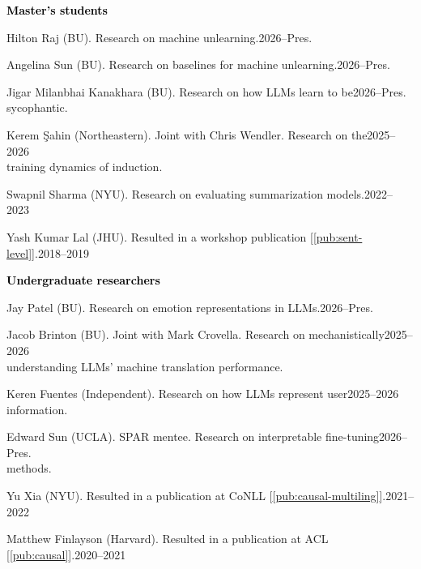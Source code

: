 \documentclass[10pt]{article}
\renewcommand{\subsection}[1]{\textcolor{black}{#1}}
\newcommand{\halfblankline}{\quad\vspace{-0.5\baselineskip}\pagebreak[3]}
\begin{document}
	\halfblankline\vspace{-0.5pt}

	\subsection{\textbf{Master's students}}
	\begin{innerlist}
	\item Hilton Raj (BU). Research on machine unlearning.\hfill 2026--Pres.
	\item Angelina Sun (BU). Research on baselines for machine unlearning.\hfill 2026--Pres.
	\item Jigar Milanbhai Kanakhara (BU). Research on how LLMs learn to be\hfill 2026--Pres.\\ sycophantic.
	\item Kerem Şahin (Northeastern). Joint with Chris Wendler. Research on the\hfill 2025--2026\\
	      training dynamics of induction.
	\item Swapnil Sharma (NYU). Research on evaluating summarization models.\hfill 2022--2023
	\item Yash Kumar Lal (JHU). Resulted in a workshop publication [\ref{pub:sent-level}].\hfill 2018--2019
	\end{innerlist}

	\halfblankline\vspace{-0.5pt}

	\subsection{\textbf{Undergraduate researchers}}
	\begin{innerlist}
	\item Jay Patel (BU). Research on emotion representations in LLMs.\hfill 2026--Pres.
	\item Jacob Brinton (BU). Joint with Mark Crovella. Research on mechanistically\hfill 2025--2026\\understanding
	      LLMs' machine translation performance.
	\item Keren Fuentes (Independent). Research on how LLMs represent user\hfill 2025--2026\\information.
	\item Edward Sun (UCLA). SPAR mentee. Research on interpretable fine-tuning\hfill 2026--Pres.\\methods.
	\item Yu Xia (NYU). Resulted in a publication at CoNLL [\ref{pub:causal-multiling}].\hfill 2021--2022
	\item Matthew Finlayson (Harvard). Resulted in a publication at ACL [\ref{pub:causal}].\hfill 2020--2021
	\end{innerlist}
\end{document}
